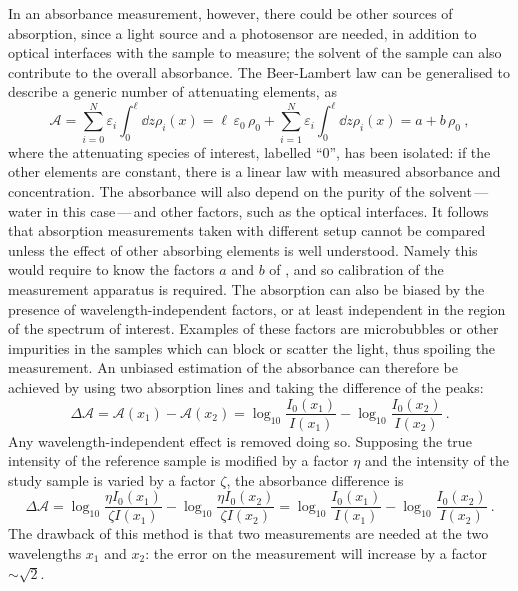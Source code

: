 In an absorbance measurement, however, there could be other sources of absorption, %
since a light source and a photosensor are needed, in addition to optical interfaces with the %
sample to measure; the solvent of the sample can also contribute to the overall absorbance.
The Beer-Lambert law can be generalised to describe a generic number of attenuating elements, %
as 
\begin{equation}
	\label{eq:linear_bl}
	\mathcal{A} = \sum_{i = 0}^N \varepsilon_i \int_0^\ell \dd{z} \rho_i (x) = %
	\ell\,\varepsilon_0\,\rho_0 +  \sum_{i = 1}^N \varepsilon_i \int_0^\ell \dd{z} \rho_i (x) = a + b \, \rho_0\ ,
\end{equation}
where the attenuating species of interest, labelled ``0'', has been isolated: %
if the other elements are constant, there is a linear law with measured absorbance and concentration.
The absorbance will also depend on the purity of the solvent\,---\,water in this case\,---\,and other factors, %
such as the optical interfaces.
It follows that absorption measurements taken with different setup cannot be compared unless the %
effect of other absorbing elements is well understood.
Namely this would require to know the factors $a$ and $b$ of , %
and so calibration of the measurement apparatus is required.
The absorption can also be biased by the presence of wavelength-independent factors, %
or at least independent in the region of the spectrum of interest.
Examples of these factors are microbubbles or other impurities in the samples which %
can block or scatter the light, thus spoiling the measurement.
An unbiased estimation of the absorbance can therefore be achieved by using two absorption lines %
and taking the difference of the peaks: %
\begin{equation}
	\Delta \mathcal{A} = \mathcal{A}(x_1) - \mathcal{A}(x_2) = %
	\log_{10} \frac{I_0 (x_1)}{I(x_1)} - \log_{10} \frac{I_0 (x_2)}{I(x_2)}\ .
\end{equation}
Any wavelength-independent effect is removed doing so.
Supposing the true intensity of the reference sample is modified by a factor $\eta$ %
and the intensity of the study sample is varied by a factor $\zeta$, the absorbance difference is
\begin{equation}
	\Delta \mathcal{A} = %
	\log_{10} \frac{\eta I_0 (x_1)}{\zeta I(x_1)} - \log_{10} \frac{\eta I_0 (x_2)}{\zeta I(x_2)} = %
	\log_{10} \frac{I_0 (x_1)}{I(x_1)} - \log_{10} \frac{I_0 (x_2)}{I(x_2)}\ .
\end{equation}
The drawback of this method is that two measurements are needed at the two wavelengths $x_1$ and $x_2$: 
the error on the measurement will increase by a factor~$\sim\sqrt{2}$.




